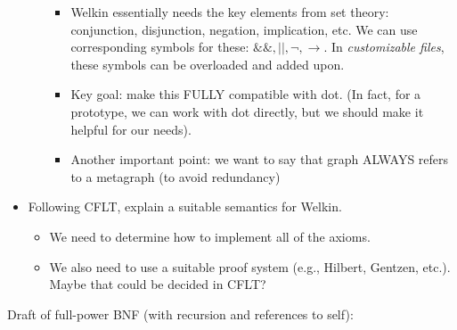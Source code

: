 \begin{itemize}
\begin{itemize}
\begin{itemize}
			            \item Welkin essentially needs the key elements from set theory: conjunction, disjunction, negation, implication, etc. We can use corresponding symbols for these: $\&\&, ||, \neg, \rightarrow$. In \textit{customizable files}, these symbols can be overloaded and added upon.
			            \item Key goal: make this FULLY compatible with dot. (In fact, for a prototype, we can work with dot directly, but we should make it helpful for our needs).
									\item Another important point: we want to say that graph ALWAYS refers to a metagraph (to avoid redundancy)		            \end{itemize}
	      \end{itemize}
	\item Following CFLT, explain a suitable semantics for Welkin.
	      \begin{itemize}
		      \item We need to determine how to implement all of the axioms.
		      \item We also need to use a suitable proof system (e.g., Hilbert, Gentzen, etc.). Maybe that could be decided in CFLT?
	      \end{itemize}
\end{itemize}

Draft of full-power BNF (with recursion and references to self):


